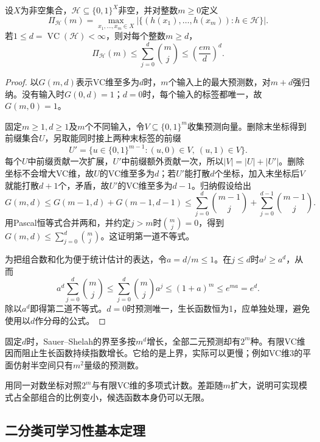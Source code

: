 \begin{lemma}
\label{lem:learning-sauer-shelah}
设$X$为非空集合，$\mathcal H\subseteq\{0,1\}^X$非空，并对整数$m\geq0$定义
\[
 \Pi_{\mathcal H}(m)
 =\max_{x_1,\ldots,x_m\in X}
 \left|\{(h(x_1),\ldots,h(x_m)):h\in\mathcal H\}\right|.
\]
若$1\leq d=\operatorname{VC}(\mathcal H)<\infty$，则对每个整数$m\geq d$，
\begin{equation}
 \Pi_{\mathcal H}(m)
 \leq\sum_{j=0}^{d}\binom{m}{j}
 \leq\left(\frac{em}{d}\right)^d.
 \label{eq:learning-sauer-shelah}
\end{equation}
\end{lemma}
\begin{proof}
以$G(m,d)$表示VC维至多为$d$时，$m$个输入上的最大预测数，对$m+d$强归纳。没有输入时$G(0,d)=1$；$d=0$时，每个输入的标签都唯一，故$G(m,0)=1$。

固定$m\geq1,d\geq1$及$m$个不同输入，令$V\subseteq\{0,1\}^{m}$收集预测向量。删除末坐标得到前缀集合$U$，另取能同时接上两种末标签的前缀
\[
 U'=\{u\in\{0,1\}^{m-1}:(u,0)\in V,\ (u,1)\in V\}.
\]
每个$U$中前缀贡献一次扩展，$U'$中前缀额外贡献一次，所以$|V|=|U|+|U'|$。删除坐标不会增大VC维，故$U$的VC维至多为$d$；若$U'$能打散$d$个坐标，加入末坐标后$V$就能打散$d+1$个，矛盾，故$U'$的VC维至多为$d-1$。归纳假设给出
\[
 G(m,d)\leq G(m-1,d)+G(m-1,d-1)
 \leq\sum_{j=0}^{d}\binom{m-1}{j}
   +\sum_{j=0}^{d-1}\binom{m-1}{j}.
\]
用Pascal恒等式合并两和，并约定$j>m$时$\binom mj=0$，得到$G(m,d)\leq\sum_{j=0}^{d}\binom mj$。这证明第一道不等式。

为把组合数和化为便于统计估计的表达，令$a=d/m\leq1$。在$j\leq d$时$a^j\geq a^d$，从而
\[
 a^d\sum_{j=0}^d\binom mj
 \leq\sum_{j=0}^d\binom mj a^j
 \leq(1+a)^m\leq e^{ma}=e^d.
\]
除以$a^d$即得第二道不等式。$d=0$时预测唯一，生长函数恒为1，应单独处理，避免使用以$d$作分母的公式。
\end{proof}

固定$d$时，Sauer--Shelah的界至多按$m^d$增长，全部二元预测却有$2^m$种。有限VC维因而阻止生长函数持续指数增长。它给的是上界，实际可以更慢；例如VC维3的平面仿射半空间只有$m^2$量级的预测数。

用同一对数坐标对照$2^m$与有限VC维的多项式计数。差距随$m$扩大，说明可实现模式占全部组合的比例变小，候选函数本身仍可以无限。

\subsection{二分类可学习性基本定理}
\label{sec:binary-learnability-characterization}

